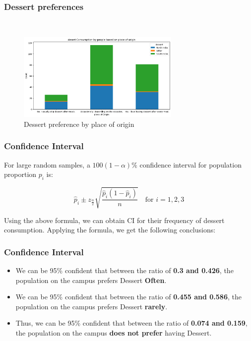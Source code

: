 \documentclass{beamer}
\begin{document}
\begin{frame}
    \frametitle{Dessert preferences }\
    \begin{figure}
    \centering
    \includegraphics[width=0.7\textwidth]{output_100_0.png} %
    \caption{ Dessert preference by place of origin } %
    \label{fig:Percentage Distribution of Cuisine} %
    \end{figure}
\end{frame}
\begin{frame}
    \frametitle{Confidence Interval}
    
    \begin{block}{}
    For large random samples, a $100(1 - \alpha)\%$ confidence interval for population proportion $p_i$ is:
    
    \[
    \hat{p}_i \pm z_{\frac{\alpha}{2}} \sqrt{\frac{\hat{p}_i(1 - \hat{p}_i)}{n}}
    \quad \text{for } i = 1, 2, 3
    \]
    \end{block}
    Using the above formula, we can obtain CI for their frequency of dessert consumption.
    Applying the formula, we get the following conclusions:

    
\end{frame}





\begin{frame}
    \frametitle{Confidence Interval}
    
    \begin{itemize}
        \item We can be  95\% confident that between the ratio of \textbf{0.3 and 0.426}, the population on the campus prefers Dessert \textbf{Often}.
        
        \item We can be  95\% confident that between the ratio of \textbf{0.455 and 0.586}, the population on the campus prefers Dessert \textbf{rarely}.
        
        \item Thus, we can be  95\% confident that between the ratio of \textbf{0.074 and 0.159}, the population on the campus \textbf{does not prefer} having Dessert.
    \end{itemize}
    
\end{frame}
\end{document}
